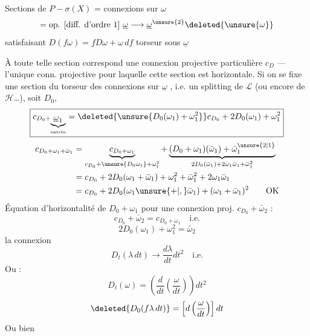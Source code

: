 Sections de $P-\sigma(X)$ = connexions sur $\omega$
\[
=\text{op. [diff. d'ordre 1] }\underline\omega\longrightarrow\underline\omega^{\unsure{2}}\deleted{\unsure{\omega}}
\]
satisfaisant $D(f\omega)=fD\omega+\omega\,df$
 torseur sous $\underline\omega$

À toute telle section correspond une connexion projective particulière $c_D$ --- l'unique conn. projective pour laquelle cette section est horizontale.
Si on se fixe une section du  torseur des connexions sur $\underline\omega$ , i.e. un splitting de $\mathcal L$ (ou encore de $\mathcal H$\ldots), soit $D_0$, 
\[
\boxed{c_{D_0+\underbrace{\underline\omega_1}_{\text{entrée}}}=\deleted{\unsure{D_0(\omega_1)+\omega_1^2}}c_{D_0}+2D_0(\omega_1)+\omega_1^2}
\]
\[
\begin{aligned}
c_{D_0+\omega_1+\bar\omega_1}
&=\underbrace{c_{D_0+\omega_1}}_{c_{D_0}+\unsure{D_0\omega_1}+\omega_1^2}
+\underbrace{(D_0+\omega_1)(\bar\omega_1)+\bar\omega_1^{\unsure{2|1}}}_{2D_0(\bar\omega_1)+2\omega_1\bar\omega_1+\bar\omega_1^2}\\
&=c_{D_0}+2D_0(\omega_1+\bar\omega_1)+\omega_1^2+\bar\omega_1^2+2\omega_1\bar\omega_1\\
&=c_{D_0}+2D_0(\omega_1\unsure{+|,}\bar\omega_1)+(\omega_1+\bar\omega_1)^2\qquad\text{OK}
\end{aligned}
\]
Équation d'horizontalité de $D_0+\omega_1$ pour une connexion proj. $c_{D_0}+\bar\omega_2$ :
\[
c_{D_0}+\bar\omega_2=c_{D_0+\omega_1}\quad\text{i.e.}
\]
\[
\boxed{2D_0(\omega_1)+\omega_1^2=\bar\omega_2}
\]
 la connexion
\[
D_t(\lambda\,dt)\longrightarrow\frac{d\lambda}{dt}dt^2\quad\text{i.e.}
\]
Ou :
\[
D_t(\omega)=\left(\frac d{dt}\left(\frac\omega{dt}\right)\right)dt^2
\]
\[
\deleted{D_0(f\lambda\,dt)}=\left[d\left(\frac\omega{dt}\right)\right]dt
\]
Ou bien

